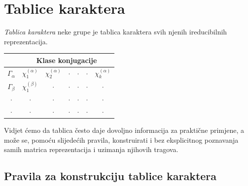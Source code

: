 \section{Tablice karaktera}

\emph{Tablica karaktera} neke grupe je tablica karaktera svih njenih
ireducibilnih reprezentacija.
\begin{center}
    \setlength{\tabcolsep}{12pt}
    \renewcommand{\arraystretch}{2.0}
\begin{tabular}{c|cccccc}
               & \multicolumn{6}{c}{Klase konjugacije} \\ \hline
  $\Gamma_{\alpha}$ & $\chi_{1}^{(\alpha)}$ & $\chi_{2}^{(\alpha)}$ & $\cdot$ &
       $\cdot$ & $\cdot$ & $\chi_{k}^{(\alpha)}$ \\
  $\Gamma_{\beta}$  & $\chi_{1}^{(\beta)}$  & $\cdot$ & $\cdot$ & $\cdot$ & $\cdot$  & $\cdot$ \\
     $\cdot$ &  $\cdot$   & $\cdot$ & $\cdot$ & $\cdot$ & $\cdot$  & $\cdot$ \\
     $\cdot$ &  $\cdot$   & $\cdot$ & $\cdot$ & $\cdot$ & $\cdot$  & $\cdot$ \\
\end{tabular}
    \renewcommand{\arraystretch}{1.0}
\end{center}
Vidjet ćemo da tablica često daje dovoljno informacija za praktične primjene, a može
se, pomoću slijedećih pravila, konstruirati i bez eksplicitnog
poznavanja samih matrica reprezentacija i uzimanja njihovih tragova.

\subsection*{Pravila za konstrukciju tablice karaktera}

